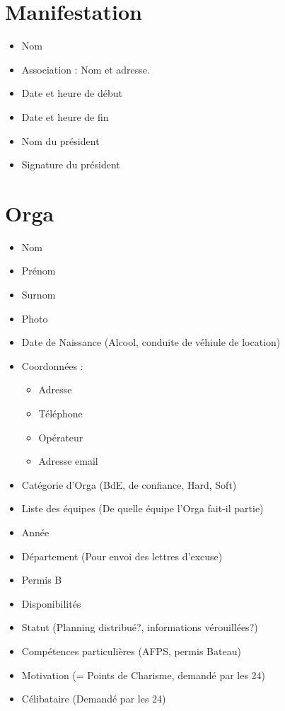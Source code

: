\section{Manifestation}
\begin{itemize}
 \item Nom
\item Association : Nom et adresse.
\item Date et heure de début
\item Date et heure de fin
\item Nom du président
\item Signature du président

\end{itemize}

\section{Orga}
\begin{itemize}
 \item Nom
\item Prénom
\item Surnom
\item Photo

\item Date de Naissance (Alcool, conduite de véhiule de location)

\item Coordonnées : \begin{itemize}
                     \item Adresse
\item Téléphone
\item Opérateur
\item Adresse email
                    \end{itemize}
\item Catégorie d'Orga (BdE, de confiance, Hard, Soft)
\item Liste des équipes (De quelle équipe l'Orga fait-il partie)
\item Année
\item Département (Pour envoi des lettres d'excuse)
\item Permis B

\item Disponibilités
\item Statut (Planning distribué?, informations vérouillées?)
\item Compétences particulières (AFPS, permis Bateau)

\item Motivation (= Points de Charisme, demandé par les 24)
\item Célibataire (Demandé par les 24)

\end{itemize}

